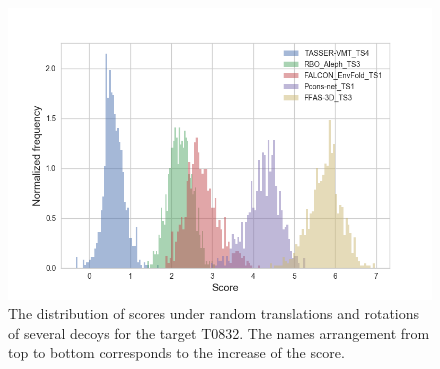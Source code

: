 \begin{figure}[H]
    \centering
    \includegraphics[width=\linewidth]{Fig/decoys_sampling_dist.png}
    \caption{The distribution of scores under random translations and rotations of several decoys for the target T0832. The 
    names arrangement from top to bottom corresponds to the increase of the score.}
    \label{Fig:DecoysScoreDistribution}
\end{figure}
